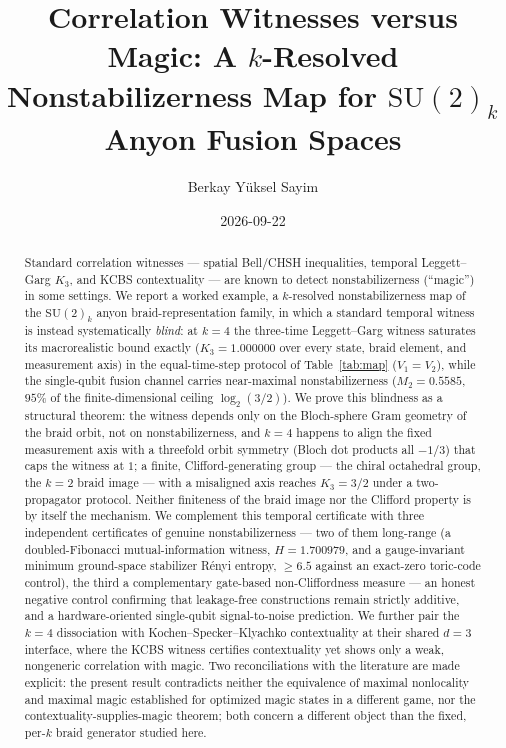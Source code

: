 \documentclass[aps,pra,twocolumn,superscriptaddress,longbibliography,floatfix,nofootinbib]{revtex4-2}
\begin{document}
\setcounter{secnumdepth}{3}

\title{Correlation Witnesses versus Magic: A $k$-Resolved Nonstabilizerness Map for $\mathrm{SU}(2)_k$ Anyon Fusion Spaces}

\author{Berkay Y\"uksel Sayim}

\date{2026-09-22}

\begin{abstract}
Standard correlation witnesses --- spatial Bell/CHSH inequalities,
temporal Leggett--Garg $K_3$, and KCBS contextuality --- are known to
detect nonstabilizerness (``magic'') in some settings. We report a
worked example, a $k$-resolved nonstabilizerness map of the
$\mathrm{SU}(2)_k$ anyon braid-representation family, in which a
standard temporal witness is instead systematically \emph{blind}: at
$k=4$ the three-time Leggett--Garg witness saturates its
macrorealistic bound exactly ($K_3=1.000000$ over every state, braid
element, and measurement axis) in the equal-time-step protocol of
Table~\ref{tab:map} ($V_1{=}V_2$), while the single-qubit fusion channel
carries near-maximal nonstabilizerness ($M_2=0.5585$, $95\%$ of the
finite-dimensional ceiling $\log_2(3/2)$). We prove this blindness as
a structural theorem: the witness depends only on the Bloch-sphere
Gram geometry of the braid orbit, not on nonstabilizerness, and $k=4$
happens to align the fixed measurement axis with a threefold orbit
symmetry (Bloch dot products all $-1/3$) that caps the witness at
$1$; a finite, Clifford-generating group --- the chiral octahedral
group, the $k{=}2$ braid image --- with a misaligned axis reaches
$K_3=3/2$ under a two-propagator protocol. Neither finiteness of the braid image nor the
Clifford property is by itself the mechanism. We complement this
temporal certificate with three independent certificates of genuine
nonstabilizerness --- two of them long-range (a doubled-Fibonacci
mutual-information witness, $H=1.700979$, and a gauge-invariant minimum
ground-space stabilizer Rényi entropy, $\geq6.5$ against an exact-zero
toric-code control), the third a complementary gate-based
non-Cliffordness measure --- an honest negative
control confirming that leakage-free constructions remain strictly
additive, and a hardware-oriented single-qubit signal-to-noise
prediction. We further pair the $k=4$ dissociation with Kochen--Specker--Klyachko
contextuality at their shared $d=3$ interface, where the KCBS witness certifies
contextuality yet shows only a weak, nongeneric correlation with magic. Two reconciliations with the literature are made explicit: the present result contradicts
neither the equivalence of maximal nonlocality and maximal magic established for optimized magic
states in a different game, nor the contextuality-supplies-magic theorem; both concern a
different object than the fixed, per-$k$ braid generator studied here.
\end{abstract}
\end{document}
